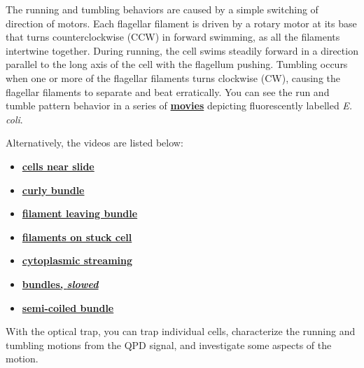 \documentclass{../lab}
\begin{document}
\newpage

The running and tumbling behaviors are caused by a simple switching of direction of motors. Each flagellar filament is driven by a rotary motor at its base that turns counterclockwise (CCW) in forward swimming, as all the filaments intertwine together. During running, the cell swims steadily forward in a direction parallel to the long axis of the cell with the flagellum pushing. Tumbling occurs when one or more of the flagellar filaments turns clockwise (CW), causing the flagellar filaments to separate and beat erratically. You can see the run and tumble pattern behavior in a series of \href{http://www.rowland.harvard.edu/labs/bacteria/movies/ecoli.php}{\textbf{movies}} depicting fluorescently labelled \emph{E. coli}.

Alternatively, the videos are listed below:

\begin{itemize}
        \item \href{http://physics111.lib.berkeley.edu/Physics111/Reprints/OTZ/cellsnearslide.avi}{\textbf{cells near slide}}

        \item \href{http://physics111.lib.berkeley.edu/Physics111/Reprints/OTZ/curlybundle.avi}{\textbf{curly bundle}}

        \item \href{http://physics111.lib.berkeley.edu/Physics111/Reprints/OTZ/filamentleavingbundle.avi}{\textbf{filament leaving bundle}}
        
        \item \href{http://physics111.lib.berkeley.edu/Physics111/Reprints/OTZ/filamentsonstuckcell.avi}{\textbf{filaments on stuck cell}}
        
        \item \href{http://physics111.lib.berkeley.edu/Physics111/Reprints/OTZ/cytoplasmicstreaming.avi}{\textbf{cytoplasmic streaming}}

        \item \href{http://physics111.lib.berkeley.edu/Physics111/Reprints/OTZ/fluorescentbundlesslow.avi}{\textbf{bundles, \emph{slowed}}}

        \item \href{http://physics111.lib.berkeley.edu/Physics111/Reprints/OTZ/semicoiledbundle.avi}{\textbf{semi-coiled bundle}}

\end{itemize}

With the optical trap, you can trap individual cells, characterize the running and tumbling motions from the QPD signal, and investigate some aspects of the motion.
\end{document}
